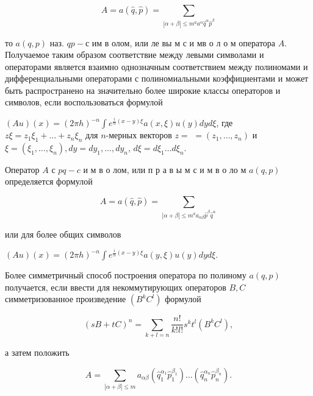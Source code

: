\documentclass[10pt]{article}
\begin{document}
\[

A=a(\hat{q}, \hat{p})=\sum_{|\alpha+\beta| \leqslant m^{a} a^{\alpha} \hat{q}^{\alpha} \hat{p}^{\beta}}

\]



то $a(q, p)$ наз. $q p-с$ им в олом, или ле вы м с и мв о л о м оператора $A$. Получаемое таким образом соответствие между левыми символами и операторами является взаимно однозначным соответствием между полиномами и дифференциальными операторами с полиномиальными коэффициентами и может быть распространено на значительно более широкие классы операторов и символов, если воспользоваться формулой



$(A u)(x)=(2 \pi h)^{-n} \int e^{\frac{i}{h}(x-y) \xi} a(x, \xi) u(y) d y d \xi$, где $z \xi=z_{1} \xi_{1}+\ldots+z_{n} \xi_{n}$ для $n$-мерных векторов $z=$ $=\left(z_{1}, \ldots, z_{n}\right)$ и $\xi=\left(\xi_{1}, \ldots, \xi_{n}\right), d y=d y_{1}, \ldots, d y_{n}$, $d \xi=d \xi_{1} \ldots d \xi_{n}$.



Оператор $A$ с $p q-c$ и м в о лом, или п р а в ы м с и м в о ло м $a(q, p)$ определяется формулой



\[

A=a(\hat{q}, \hat{p})=\sum_{|\alpha+\beta| \leqslant m^{a} a_{\alpha \beta} \hat{p}^{\beta} \hat{q}^{\alpha}}

\]



или для более общих символов



$(A u)(x)=(2 \pi h)^{-n} \int e^{\frac{i}{h}(x-y) \xi} a(y, \xi) u(y) d y d \xi$.



Более симметричный способ построения оператора по полиному $a(q, p)$ получается, если ввести для некоммутирующих операторов $B, C$ симметризованное произведение $\left(B^{k} C^{l}\right)$ формулой



\[

(s B+t C)^{n}=\sum_{k+l=n} \frac{n !}{k ! l !} s^{k} t^{l}\left(B^{k} C^{l}\right),

\]



а затем положить



\[

A=\sum_{|\alpha+\beta| \leqslant m} a_{\alpha \beta}\left(\hat{q}_{1}^{\alpha_{1}} \hat{p}_{1}^{\beta_{1}}\right) \ldots\left(\hat{q}_{n}^{\alpha_{n}} \hat{p}_{n}^{\beta_{n}}\right) .

\]
\end{document}
